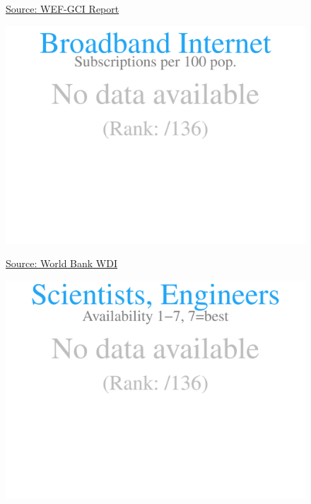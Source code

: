 \documentclass{article}\usepackage[]{graphicx}\usepackage[]{color}
\makeatletter
\def\maxwidth{ %
  \ifdim\Gin@nat@width>\linewidth
    \linewidth
  \else
    \Gin@nat@width
  \fi
}
\makeatother
\begin{document}
\begin{figure}
\begin{minipage}[t]{0.99\textwidth}
\begin{minipage}[t]{0.56\textwidth}
\begin{minipage}[c]{0.30\textwidth}
    \vspace{-2ex}
    \hspace{2ex}\tiny{\href{http://reports.weforum.org/global-competitiveness-index/}{\textcolor[HTML]{22A6F5}{Source: WEF-GCI Report}}}
    \vspace{3ex}
    \end{minipage}
    \begin{minipage}[c]{0.30\textwidth}


{\centering \includegraphics[width=\maxwidth]{figure/figure_sparkline3-1} 

}



    \vspace{-2ex}
    \hspace{2ex}\tiny{\href{http://data.worldbank.org}{\textcolor[HTML]{22A6F5}{Source: World Bank WDI}}}
    \vspace{3ex}
    \end{minipage}
    
    \begin{minipage}[c]{0.30\textwidth}


{\centering \includegraphics[width=\maxwidth]{figure/figure_sparkline4-1} 

}
\end{minipage}
\end{minipage}
\end{minipage}
\end{figure}
\end{document}
